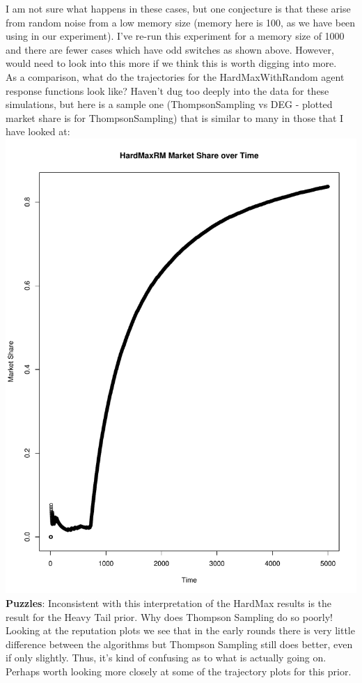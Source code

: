 \documentclass[11pt,letterpaper]{article}
\begin{document}
I am not sure what happens in these cases, but one conjecture is that these arise from random noise from a low memory size (memory here is 100, as we have been using in our experiment). I've re-run this experiment for a memory size of 1000 and there are fewer cases which have odd switches as shown above. However, would need to look into this more if we think this is worth digging into more.\\
As a comparison, what do the trajectories for the HardMaxWithRandom agent response functions look like? Haven't dug too deeply into the data for these simulations, but here is a sample one (ThompsonSampling vs DEG - plotted market share is for ThompsonSampling) that is similar to many in those that I have looked at: \\
\includegraphics[scale=0.25]{hmr_over_time} \\
\textbf{Puzzles}: Inconsistent with this interpretation of the HardMax results is the result for the Heavy Tail prior. Why does Thompson Sampling do so poorly! Looking at the reputation plots we see that in the early rounds there is very little difference between the algorithms but Thompson Sampling still does better, even if only slightly. Thus, it's kind of confusing as to what is actually going on. Perhaps worth looking more closely at some of the trajectory plots for this prior.\\
\end{document}
